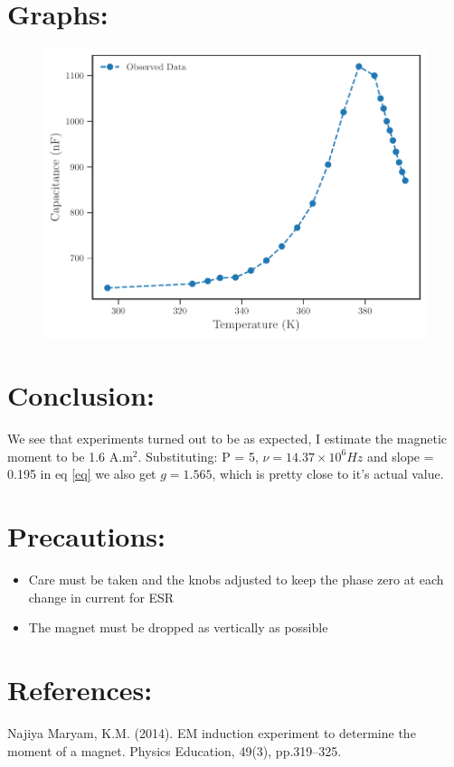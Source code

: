 \documentclass{../_layouts/ieeeconf}
\begin{document}
\section{Graphs:}
\begin{figure}[H]
\centering
\includegraphics[width = \columnwidth]{../_assets/Capacitance.pdf}
\end{figure}
\section{Conclusion:}
We see that experiments turned out to be as expected, I estimate the magnetic moment to be 1.6 A.m\(^2\). Substituting: P = 5, \(\nu = 14.37 \times 10^6 Hz\) and slope = 0.195 in eq \ref{eq} we also get \(g = 1.565\), which is pretty close to it's actual value.
\section{Precautions:}
\begin{itemize}
\tightlist
\item
Care must be taken and the knobs adjusted to keep the phase zero at each change in current for ESR
\item
The magnet must be dropped as vertically as possible
\end{itemize}
\section{References:}
Najiya Maryam, K.M. (2014). EM induction experiment to determine the moment of a magnet. Physics Education, 49(3), pp.319--325.
\end{document}
